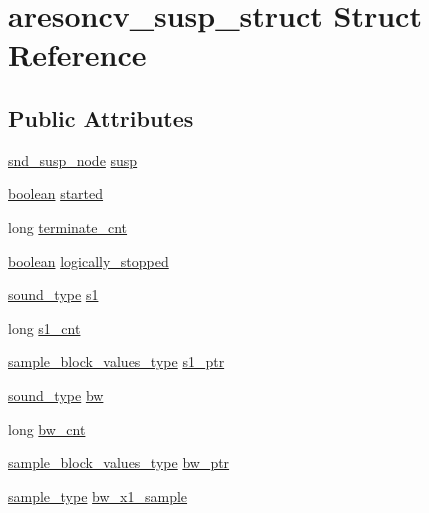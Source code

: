 \hypertarget{structaresoncv__susp__struct}{}\section{aresoncv\+\_\+susp\+\_\+struct Struct Reference}
\label{structaresoncv__susp__struct}
\subsection*{Public Attributes}
\begin{DoxyCompactItemize}
\item 
\hyperlink{sound_8h_a6b268203688a934bd798ceb55f85d4c0}{snd\+\_\+susp\+\_\+node} \hyperlink{structaresoncv__susp__struct_ac4f9e8fb147c2c0afe86b021df79fc19}{susp}
\item 
\hyperlink{cext_8h_a7670a4e8a07d9ebb00411948b0bbf86d}{boolean} \hyperlink{structaresoncv__susp__struct_a08b77d73b0db401c68ce2edcd18773ab}{started}
\item 
long \hyperlink{structaresoncv__susp__struct_a093aba7a8863f727ef5d62b7e30d554f}{terminate\+\_\+cnt}
\item 
\hyperlink{cext_8h_a7670a4e8a07d9ebb00411948b0bbf86d}{boolean} \hyperlink{structaresoncv__susp__struct_ad07d404acc6d2f9c7a0e3be0311e10f4}{logically\+\_\+stopped}
\item 
\hyperlink{sound_8h_a792cec4ed9d6d636d342d9365ba265ea}{sound\+\_\+type} \hyperlink{structaresoncv__susp__struct_a62ac78b3e23f367d6df4df7765b1908a}{s1}
\item 
long \hyperlink{structaresoncv__susp__struct_afd59d97247bff77a60ea4433f69c971c}{s1\+\_\+cnt}
\item 
\hyperlink{sound_8h_a83d17f7b465d1591f27cd28fc5eb8a03}{sample\+\_\+block\+\_\+values\+\_\+type} \hyperlink{structaresoncv__susp__struct_a14daea95d35729dc9d21238851c2023e}{s1\+\_\+ptr}
\item 
\hyperlink{sound_8h_a792cec4ed9d6d636d342d9365ba265ea}{sound\+\_\+type} \hyperlink{structaresoncv__susp__struct_af742db5268eab56487c47e17d25eb479}{bw}
\item 
long \hyperlink{structaresoncv__susp__struct_a3a6b2d7744c76c65894742458ddb7455}{bw\+\_\+cnt}
\item 
\hyperlink{sound_8h_a83d17f7b465d1591f27cd28fc5eb8a03}{sample\+\_\+block\+\_\+values\+\_\+type} \hyperlink{structaresoncv__susp__struct_abc1af1ca41324fd75c273a67c17c9c2c}{bw\+\_\+ptr}
\item 
\hyperlink{sound_8h_a3a9d1d4a1c153390d2401a6e9f71b32c}{sample\+\_\+type} \hyperlink{structaresoncv__susp__struct_a066a80eec2372b6025ab063f51711c73}{bw\+\_\+x1\+\_\+sample}

\end{DoxyCompactItemize}
